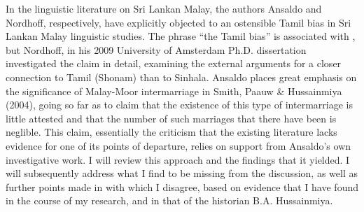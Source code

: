 In the linguistic literature on Sri Lankan Malay, the authors Ansaldo and Nordhoff, respectively, have explicitly objected to an ostensible Tamil bias in Sri Lankan Malay linguistic studies. The phrase ``the Tamil bias'' is associated with \citet{Ansaldo2008genesis}, but Nordhoff, in his 2009 University of Amsterdam Ph.D. dissertation investigated the claim in detail, examining the external arguments for a closer connection to Tamil (Shonam) than to Sinhala. Ansaldo places great emphasis on the significance of Malay-Moor intermarriage in Smith, Paauw \& Hussainmiya (2004), going so far as to claim that the existence of this type of intermarriage is little attested and that the number of such marriages that there have been is neglible. This claim, essentially the criticism that the existing literature lacks evidence for one of its points of departure, relies on support from Ansaldo's own investigative work. I will review this approach and the findings that it yielded. I will subsequently address what I find to be missing from the discussion, as well as further points made in \citet{Ansaldo2008genesis,Ansaldo2011a} with which I disagree, based on evidence that I have found in the course of my research, and in that of the historian B.A. Hussainmiya.

